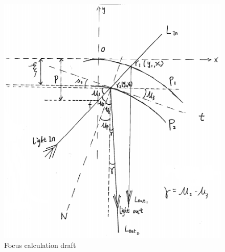 \begin{figure}[ht!]
\centering
\includegraphics[scale = 1.1]{chapters/img/focus.png}
\caption{Focus calculation draft}
\label{fig:focus}
\end{figure}

